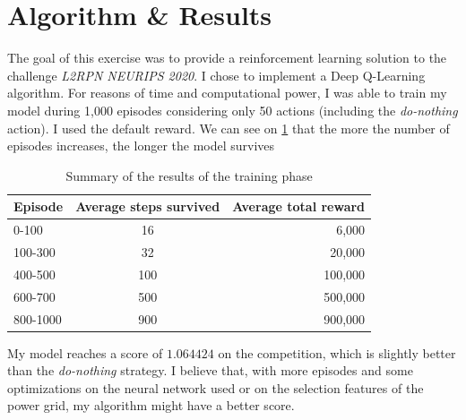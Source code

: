 \documentclass[a4paper]{article}
\begin{document}
\section{Algorithm \& Results}
The goal of this exercise was to provide a reinforcement learning solution to the challenge
\textit{L2RPN NEURIPS 2020}\cite{L2RPN}. I chose to implement a Deep Q-Learning algorithm.
For reasons of time and computational power, I was able to train my model during 1,000 episodes
considering only 50 actions (including the \textit{do-nothing} action). I used the default reward.
We can see on \ref{table:results} that the more the number of episodes increases, the longer the model survives
\begin{table}[H]
  \centering
  \begin{tabular}{|l|c|r|}
    \hline
    Episode & Average steps survived & Average total reward \\
    \hline
    0-100 & 16 & 6,000 \\
    \hline
    100-300 & 32 & 20,000 \\
    \hline
    400-500 & 100 & 100,000\\
    \hline
    600-700 & 500 & 500,000\\
    \hline
    800-1000 & 900 & 900,000\\
    \hline
  \end{tabular}
  \caption{Summary of the results of the training phase}
  \label{table:results}
\end{table}

My model reaches a score of $1.064424$ on the competition, which is slightly better than the \textit{do-nothing}
strategy. I believe that, with more episodes and some optimizations on the neural network
used or on the selection features of the power grid, my algorithm might have a better score.
\end{document}
